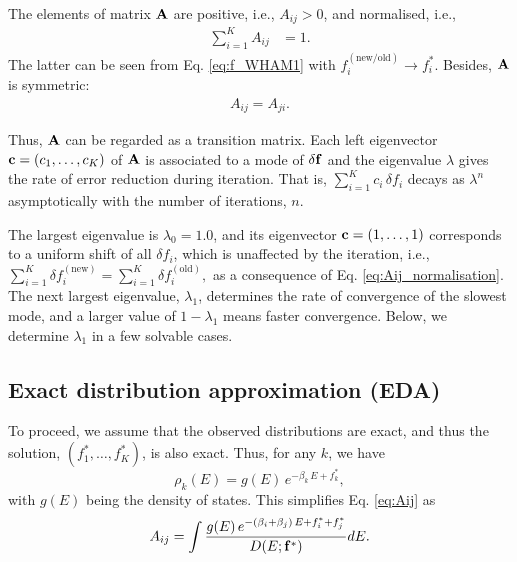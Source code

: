 \documentclass{gMOS2e}
\begin{document}
The elements of matrix $\mathbf{A}$
are positive, i.e.,
%
$A_{ij} > 0$,
and normalised, i.e.,
%
\begin{align}
\sum_{i = 1}^K A_{ij} &= 1.
\label{eq:Aij_normalisation}
\end{align}
%
The latter can be seen from
Eq. \eqref{eq:f_WHAM1}
with
$f_i^\mathrm{(new/old)} \rightarrow f_i^*$.
%
Besides,
$\mathbf{A}$ is symmetric:
%
\begin{align}
  A_{ij} = A_{ji}.
\label{eq:Aij_symmetry}
\end{align}
%



Thus,
$\mathbf{A}$
can be regarded as a transition matrix\cite{
newman}.
%
Each left eigenvector
$\mathbf{c} = (c_1, \dots, c_K)$
of $\mathbf{A}$
is associated to a mode of $\delta \mathbf{f}$
and the eigenvalue $\lambda$
gives the rate of error reduction
during iteration.
%
That is,
$\sum_{i = 1}^K c_i \, \delta f_i$
decays as $\lambda^n$
asymptotically
with the number of iterations, $n$.




The largest eigenvalue is $\lambda_0 = 1.0$,
and its eigenvector
$\mathbf{c} = (1, \dots, 1)$
corresponds to a uniform shift of all
$\delta f_i$,
which is unaffected by the iteration,
%
i.e.,
$
\sum_{i=1}^K \delta f_i^\mathrm{(new)}
=
\sum_{i=1}^K \delta f_i^\mathrm{(old)},
$
as a consequence of
Eq. \eqref{eq:Aij_normalisation}.
%
The next largest eigenvalue,
$\lambda_1$,
determines the rate of convergence
of the slowest mode,
%
and a larger value of
$1 - \lambda_1$
means faster convergence.
%
Below,
we determine $\lambda_1$
in a few solvable cases.



\subsection{Exact distribution approximation (EDA)}



To proceed, we assume that
the observed distributions are exact,
%
and thus the solution,
$(f_1^*, \dots, f_K^*)$,
is also exact.
%
Thus, for any $k$, we have
%
\begin{equation}
\rho_k(E)
=
g(E) \,
e^{-\beta_k \, E + f_k^*},
\label{eq:rho_EDA}
\end{equation}
%
with $g(E)$ being the density of states.
%
%
This simplifies Eq. \eqref{eq:Aij} as
%
\begin{align}
A_{ij}
=
\int
\frac
{
  g(E) \, e^{ -(\beta_i + \beta_j) \, E + f_i^* + f_j^*}
}
{
  D(E; \mathbf{f}^*)
}
dE.
\label{eq:Aij_EDA}
\end{align}
\end{document}
